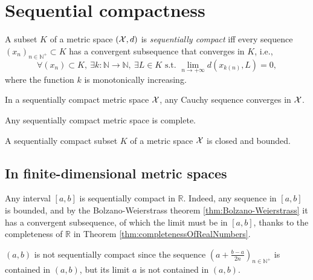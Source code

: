 \section{Sequential compactness}
\label{sec:sequentialCompactness}

\begin{defn}
  \label{def:sequentialCompactness}
  A subset $K$ of a metric space $({\cal X},d)$
  is \emph{sequentially compact}
  iff every sequence $(x_n)_{n\in \mathbb{N}^+}\subset K$ has
  a convergent subsequence that converges in $K$, i.e., 
  \begin{equation}
    \label{eq:sequentialCompactness}
    \forall (x_n)\subset K,\
    \exists k: \mathbb{N}\rightarrow \mathbb{N},\ \exists L\in K
    \text{ s.t. }
    \lim_{n\rightarrow +\infty} d(x_{k(n)}, L)=0, 
  \end{equation}
  where the function $k$ is monotonically increasing. 
\end{defn}

\begin{lem}
  \label{lem:CauchySeqInCompactMetric}
  In a sequentially compact metric space ${\cal X}$,   
  any Cauchy sequence converges in ${\cal X}$.
\end{lem}

\begin{coro}
  \label{coro:compactnessImpliesCompleteness}
  Any sequentially compact metric space is complete.
\end{coro}

\begin{lem}
  \label{lem:compactSetsIsClosedAndBounded}
  A sequentially compact subset $K$ of a metric space ${\cal X}$
  is closed and bounded.
\end{lem}

\subsection{In finite-dimensional metric spaces}

\begin{exm}
  Any interval $[a,b]$ is sequentially compact in $\mathbb{R}$.
  Indeed, any sequence in $[a,b]$
  is bounded, and by the Bolzano-Weierstrass theorem
  \ref{thm:Bolzano-Weierstrass}
  it has a convergent subsequence,
  of which the limit must be in $[a,b]$, 
  thanks to the completeness of $\mathbb{R}$
  in Theorem \ref{thm:completenessOfRealNumbers}.
\end{exm}

\begin{exm}
  $(a,b)$ is not sequentially compact
  since the sequence
  $\left(a+\frac{b-a}{2n}\right)_{n\in \mathbb{N}^+}$
  is contained in $(a,b)$,
  but its limit $a$ is not contained in $(a,b)$.
\end{exm}

